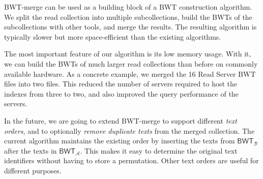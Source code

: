 \documentclass[smallabstract,smallcaptions]{dccpaper}
\newcommand{\BWT}{\textsf{BWT}}
\newcommand{\mSA}{\ensuremath{\mathsf{SA}}}
\newcommand{\mBWT}{\ensuremath{\mathsf{BWT}}}
\newcommand{\mLF}{\ensuremath{\mathsf{LF}}}
\newcommand{\mselect}{\ensuremath{\mathsf{select}}}
\newcommand{\Acoll}{\ensuremath{\mathcal{A}}}
\newcommand{\Bcoll}{\ensuremath{\mathcal{B}}}
\newcommand{\BWTmerge}{\textsf{BWT\nobreakdash-merge}}
\begin{document}
\BWTmerge{} can be used as a building block of a \BWT{} construction algorithm. We split the read collection into multiple subcollections, build the \BWT{}s of the subcollections with other tools, and merge the results. The resulting algorithm is typically slower but more space-efficient than the existing algorithms.

The most important feature of our algorithm is its low memory usage. With it, we can build the \BWT{}s of much larger read collections than before on commonly available hardware. As a concrete example, we merged the 16 Read Server \BWT{} files into two files. This reduced the number of servers required to host the indexes from three to two, and also improved the query performance of the servers.

In the future, we are going to extend \BWTmerge{} to support different \emph{text orders}, and to optionally \emph{remove duplicate texts} from the merged collection. The current algorithm maintains the existing order by inserting the texts from $\mBWT_{\Bcoll}$ after the texts in $\mBWT_{\Acoll}$. This makes it easy to determine the original text identifiers without having to store a permutation. Other text orders are useful for different purposes.

%




\end{document}
